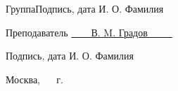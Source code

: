 \begin{titlepage}
	\vspace{2mm}
	\noindent\textnormal{\hphantom{Студент}} \hspace{23mm}\noindent
	\fontsize{8pt}{8pt}
	\textnormal{Группа}\hspace{40mm}\textnormal{Подпись, дата} \hspace{32mm}\noindent\textnormal{И. О. Фамилия}
	
	\vspace{0.5cm}
	
	\fontsize{12pt}{12pt}\selectfont
	\noindent\textnormal{Преподаватель} \hspace{51mm}
	\underline{\textnormal{\hphantom{\hspace{40mm}}}} \hspace{14mm}
	\noindent\underline{\textnormal{~~~~В. M. Градов~~~~~}}
	
	\vspace{2mm}
	\noindent\textnormal{\hphantom{Студент}} \hspace{17mm}\noindent
	\fontsize{8pt}{8pt}
	\hphantom{Группа}\hspace{43mm}\textnormal{Подпись, дата} \hspace{32mm}\noindent\textnormal{И. О. Фамилия}
	
	\vspace{0.5cm}
	
	\fontsize{12pt}{12pt}\selectfont
	
	\begin{center}
		\vfill
		Москва, ~\the\year
		~г.
	\end{center}
	\restoregeometry
	
\end{titlepage}
